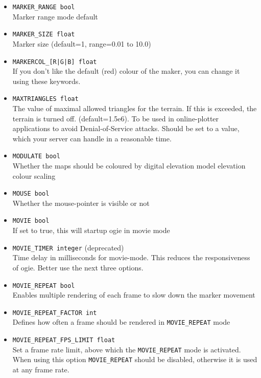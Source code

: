 \begin{itemize}
\item \texttt{MARKER\_RANGE bool} \\
Marker range mode default

\item \texttt{MARKER\_SIZE float} \\
Marker size (default=1, range=0.01 to 10.0)

\item \texttt{MARKERCOL\_[R|G|B] float}\\
If you don't like the default (red) colour of the maker, you can change it using these keywords.

\item \texttt{MAXTRIANGLES float} \\
The value of maximal allowed triangles for the terrain. If this is exceeded, the terrain is turned
off. (default=1.5e6). To be used in online-plotter applications to avoid Denial-of-Service attacks.
Should be set to a value, which your server can handle in a reasonable time.

\item \texttt{MODULATE bool} \\
Whether the maps should be coloured by digital elevation model  elevation colour scaling

\item \texttt{MOUSE bool} \\
Whether the mouse-pointer is visible or not

\item \texttt{MOVIE bool} \\
If set to true, this will startup ogie in movie mode

\item \texttt{MOVIE\_TIMER integer} (deprecated) \\
Time delay in milliseconds for movie-mode. This reduces the responsiveness of ogie. Better use the next three options.

\item \texttt{MOVIE\_REPEAT bool} \\
Enables multiple rendering of each frame to slow down the marker movement

\item \texttt{MOVIE\_REPEAT\_FACTOR int} \\
Defines how often a frame should be rendered in \texttt{MOVIE\_REPEAT} mode

\item \texttt{MOVIE\_REPEAT\_FPS\_LIMIT float} \\
Set a frame rate limit, above which the \texttt{MOVIE\_REPEAT} mode is activated. When using this option \texttt{MOVIE\_REPEAT}
should be disabled, otherwise it is used at any frame rate.


\end{itemize}
